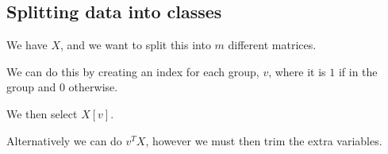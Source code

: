 
\subsection{Splitting data into classes}

We have \(X\), and we want to split this into \(m\) different matrices.

We can do this by creating an index for each group, \(v\), where it is \(1\) if in the group and \(0\) otherwise.

We then select \(X[v]\).

Alternatively we can do \(v^TX\), however we must then trim the extra variables.

